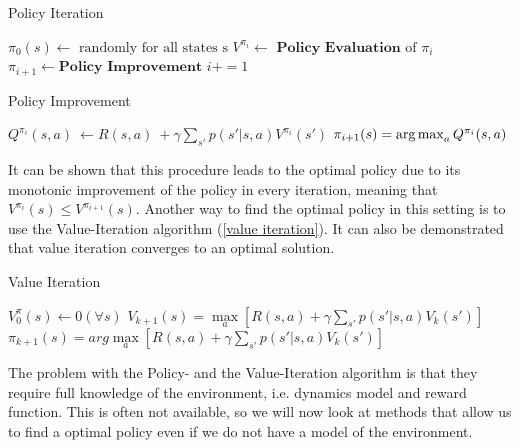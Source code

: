 \hspace{-0.7cm}
\begin{minipage}[t]{0.45\textwidth}
\begin{algorithm}[H]
   \large
    \caption{Policy Iteration}\label{policy iteration}
    \begin{algorithmic}
        \STATE  $\pi_0(s) \gets \text{ randomly for all states s} $
                \STATE $V^{\pi_i} \gets \textbf{ Policy Evaluation} \text{ of } \pi_i$
                \STATE $\pi_{i+1} \gets \textbf{Policy Improvement}$
                \STATE $i+=1$
            \ENDWHILE
    \end{algorithmic}
\end{algorithm}
\end{minipage}
\begin{minipage}[t]{0.55\textwidth}
\begin{algorithm}[H]
  \large
    \caption{Policy Improvement}\label{policy improvement}
    \begin{algorithmic}
        \STATE $Q^{\pi_i}(s,a) \ \gets R(s,a) \ + \gamma \sum_{s'}p(s'|s,a) V^{\pi_i}(s')$
        \ENDFOR
        \STATE $\pi_{i+1}(s) = \operatorname*{arg\,max}_{a} Q^{\pi_i}(s,a)$
        \ENDFOR
    \end{algorithmic}
\end{algorithm}
\vspace{0.3cm}
\end{minipage}
It can be shown that this procedure leads to the optimal policy due to its monotonic 
improvement of the policy in every iteration, meaning that $V^{\pi_i}(s) \leq V^{\pi_{i+1}}(s)$.\newline
Another way to find the optimal policy in this setting  is to use the Value-Iteration algorithm 
(\ref{value iteration}). It can also be demonstrated that value iteration converges to an optimal solution. 
\begin{algorithm}[H]
  \large
    \caption{Value Iteration}\label{value iteration}
    \begin{algorithmic}
        \STATE $V_0^{\pi}(s)\gets 0 (\forall s)$
        \STATE $V_{k+1}(s)=\max\limits_{a}\left[R(s,a)+\gamma \sum_{s'}p(s'|s,a)V_k(s')\right]$ 
        \STATE $\pi_{k+1}(s)=arg \max\limits_{a}\left[R(s,a)+\gamma \sum_{s'}p(s'|s,a)V_k(s')\right]$
            \ENDFOR
        \ENDWHILE
    \end{algorithmic}
\end{algorithm}
The problem with the Policy- and the Value-Iteration algorithm is that they require 
full knowledge of the environment, i.e. dynamics model and reward function. This is often 
not available, so we will now look at methods that allow us to find a optimal policy even 
if we do not have a model of the environment.
